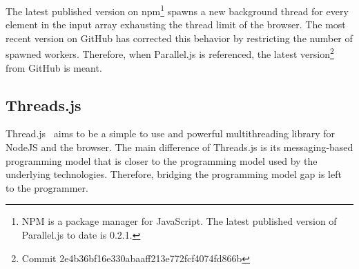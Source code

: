 \begin{remark}
The latest published version on npm\footnote{NPM is a package manager for JavaScript. The latest published version of Parallel.js to date is 0.2.1.} spawns a new background thread for every element in the input array exhausting the thread limit of the browser. The most recent version on GitHub has corrected this behavior by restricting the number of spawned workers. Therefore, when Parallel.js is referenced, the latest version\footnote{Commit 2e4b36bf16e330abaaff213e772fcf4074fd866b} from GitHub is meant.	
\end{remark}

\subsection{Threads.js}
Thread.js~\cite{Wermke2016} aims to be a simple to use and powerful multithreading library for NodeJS and the browser. The main difference of Threads.js is its messaging-based programming model that is closer to the programming model used by the underlying technologies. Therefore, bridging the programming model gap is left to the programmer.